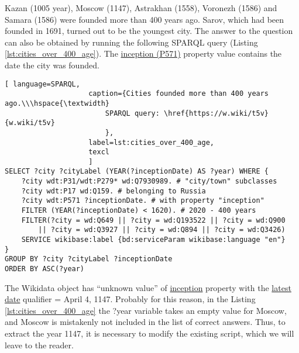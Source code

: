Kazan (1005 year), Moscow (1147), Astrakhan (1558), Voronezh (1586) and Samara (1586) were founded more than 400 years ago. Sarov, which had been founded in 1691, turned out to be the youngest city. The answer to the question can also be obtained by running the following SPARQL query (Listing \ref{lst:cities_over_400_age}). The \href{https://www.wikidata.org/wiki/Property:P571}{inception (P571)} property value contains the date the city was founded.

\begin{lstlisting}[ language=SPARQL, 
                    caption={Cities founded more than 400 years ago.\\\hspace{\textwidth}
                        SPARQL query: \href{https://w.wiki/t5v}{w.wiki/t5v}
                        },
                    label=lst:cities_over_400_age,
                    texcl 
                    ]
SELECT ?city ?cityLabel (YEAR(?inceptionDate) AS ?year) WHERE {
	?city wdt:P31/wdt:P279* wd:Q7930989. # "city/town" subclasses
	?city wdt:P17 wd:Q159. # belonging to Russia
	?city wdt:P571 ?inceptionDate. # with property "inception"  
	FILTER (YEAR(?inceptionDate) < 1620). # 2020 - 400 years
	FILTER(?city = wd:Q649 || ?city = wd:Q193522 || ?city = wd:Q900
		|| ?city = wd:Q3927 || ?city = wd:Q894 || ?city = wd:Q3426)
	SERVICE wikibase:label {bd:serviceParam wikibase:language "en"}
}
GROUP BY ?city ?cityLabel ?inceptionDate
ORDER BY ASC(?year)
\end{lstlisting}%



The Wikidata object  has ``unknown value'' of \href{https://www.wikidata.org/wiki/Property:P571}{inception} property with the \href{https://www.wikidata.org/wiki/Property:P1326}{latest date} qualifier = April 4, 1147. Probably for this reason, in the Listing \ref{lst:cities_over_400_age} the ?year variable takes an empty value for Moscow, and Moscow is mistakenly not included in the list of correct answers. Thus, to extract the year 1147, it is necessary to modify the existing script, which we will leave to the reader.

